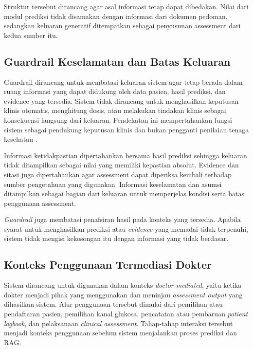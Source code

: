 Struktur tersebut dirancang agar asal informasi tetap dapat dibedakan. Nilai dari modul prediksi tidak disamakan dengan informasi dari dokumen pedoman,
sedangkan keluaran generatif ditempatkan sebagai penyusunan assessment dari kedua sumber itu.

\subsection{Guardrail Keselamatan dan Batas Keluaran} 
\label{subsec:bab4-guardrail-keselamatan}

Guardrail dirancang untuk membatasi keluaran sistem agar tetap berada dalam ruang informasi yang dapat didukung oleh data pasien, hasil prediksi, dan evidence yang tersedia. Sistem
tidak dirancang untuk menghasilkan keputusan klinis otomatis, menghitung dosis, atau melakukan tindakan klinis sebagai konsekuensi langsung dari keluaran. Pendekatan ini mempertahankan
fungsi sistem sebagai pendukung keputusan klinis dan bukan pengganti penilaian tenaga kesehatan \parencite{sutton2020}.

Informasi ketidakpastian dipertahankan bersama hasil prediksi sehingga keluaran tidak ditampilkan sebagai nilai yang memiliki kepastian absolut. Evidence dan sitasi juga dipertahankan
agar assessment dapat diperiksa kembali terhadap sumber pengetahuan yang digunakan. Informasi keselamatan dan asumsi ditampilkan sebagai bagian dari keluaran untuk memperjelas kondisi
serta batas penggunaan assessment.

\textit{Guardrail} juga membatasi penafsiran hasil pada konteks yang tersedia. Apabila syarat untuk menghasilkan prediksi atau \textit{evidence} yang memadai tidak
terpenuhi, sistem tidak mengisi kekosongan itu dengan informasi yang tidak berdasar.

\subsection{Konteks Penggunaan Termediasi Dokter} 
\label{subsec:bab4-konteks-penggunaan-doctor-mediated}

Sistem dirancang untuk digunakan dalam konteks \textit{doctor-mediated}, yaitu ketika dokter menjadi pihak yang menggunakan dan meninjau \textit{assessment output} yang dihasilkan
sistem. Alur penggunaan tersebut dimulai dari pemilihan atau pendaftaran pasien, pemilihan kanal glukosa, pencatatan atau pembaruan \textit{patient logbook}, dan pelaksanaan
\textit{clinical assessment}. Tahap-tahap interaksi tersebut menjadi konteks penggunaan sebelum sistem menjalankan proses prediksi dan RAG.

